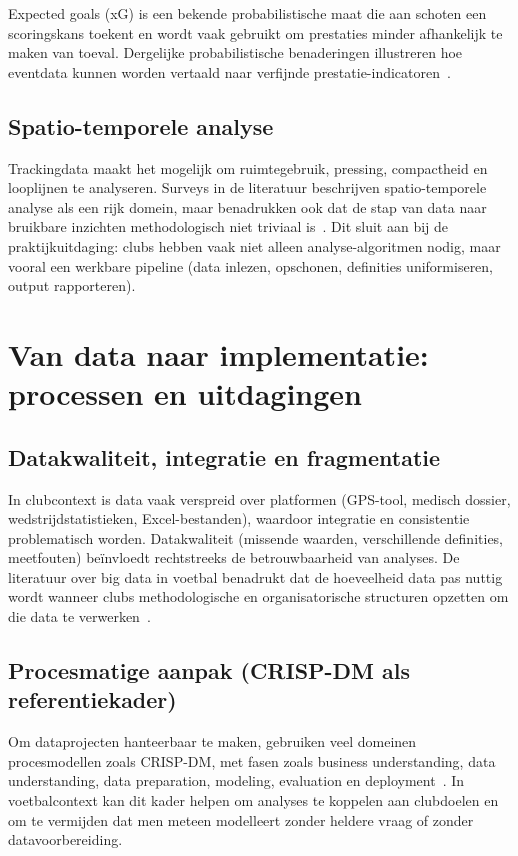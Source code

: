 Expected goals (xG) is een bekende probabilistische maat die aan schoten een scoringskans toekent en wordt vaak gebruikt om prestaties minder afhankelijk te maken van toeval.
Dergelijke probabilistische benaderingen illustreren hoe eventdata kunnen worden vertaald naar verfijnde prestatie-indicatoren~\autocite{Pappalardo2019}.

\subsection{Spatio-temporele analyse}

Trackingdata maakt het mogelijk om ruimtegebruik, pressing, compactheid en looplijnen te analyseren.
Surveys in de literatuur beschrijven spatio-temporele analyse als een rijk domein, maar benadrukken ook dat de stap van data naar bruikbare inzichten methodologisch niet triviaal is~\autocite{Gudmundsson2017}.
Dit sluit aan bij de praktijkuitdaging: clubs hebben vaak niet alleen analyse-algoritmen nodig, maar vooral een werkbare pipeline (data inlezen, opschonen, definities uniformiseren, output rapporteren).

\section{Van data naar implementatie: processen en uitdagingen}

\subsection{Datakwaliteit, integratie en fragmentatie}

In clubcontext is data vaak verspreid over platformen (GPS-tool, medisch dossier, wedstrijdstatistieken, Excel-bestanden), waardoor integratie en consistentie problematisch worden.
Datakwaliteit (missende waarden, verschillende definities, meetfouten) beïnvloedt rechtstreeks de betrouwbaarheid van analyses.
De literatuur over big data in voetbal benadrukt dat de hoeveelheid data pas nuttig wordt wanneer clubs methodologische en organisatorische structuren opzetten om die data te verwerken~\autocite{Rein2016}.

\subsection{Procesmatige aanpak (CRISP-DM als referentiekader)}

Om dataprojecten hanteerbaar te maken, gebruiken veel domeinen procesmodellen zoals CRISP-DM, met fasen zoals business understanding, data understanding, data preparation, modeling, evaluation en deployment~\autocite{CRISPDM2000}.
In voetbalcontext kan dit kader helpen om analyses te koppelen aan clubdoelen en om te vermijden dat men meteen modelleert zonder heldere vraag of zonder datavoorbereiding.

